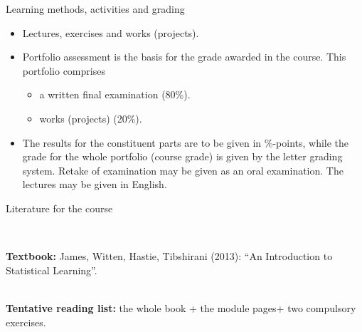 \documentclass[ignorenonframetext,]{beamer}
\providecommand{\tightlist}{%
  \setlength{\itemsep}{0pt}\setlength{\parskip}{0pt}}
\begin{document}
\begin{frame}

\begin{block}{Learning methods, activities and grading}

\begin{itemize}
\item
  Lectures, exercises and works (projects). ~
\item
  Portfolio assessment is the basis for the grade awarded in the course.
  This portfolio comprises

  \begin{itemize}
  \tightlist
  \item
    a written final examination (80\%).
  \item
    works (projects) (20\%). ~
  \end{itemize}
\item
  The results for the constituent parts are to be given in \%-points,
  while the grade for the whole portfolio (course grade) is given by the
  letter grading system. Retake of examination may be given as an oral
  examination. The lectures may be given in English.
\end{itemize}

\end{block}

\end{frame}

\begin{frame}

\begin{block}{Literature for the course}

~\\
\hspace*{0.333em}

\textbf{Textbook:} James, Witten, Hastie, Tibshirani (2013): ``An
Introduction to Statistical Learning''.

~\\
\textbf{Tentative reading list:} the whole book + the module pages+ two
compulsory exercises.

\end{block}

\end{frame}
\end{document}
